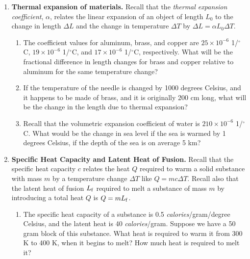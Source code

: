 \documentclass[10pt]{article}
\begin{document}
\maketitle

\begin{enumerate}
\item \textbf{Thermal expansion of materials.}  Recall that the \textit{thermal expansion coefficient}, $\alpha$, relates the linear expansion of an object of length $L_0$ to the change in length $\Delta L$ and the change in temperature $\Delta T$ by $\Delta L = \alpha L_0 \Delta T$.
\begin{enumerate}
\item The coefficient values for aluminum, brass, and copper are $25 \times 10^{-6}$ 1/$^{\circ}$C, $19 \times 10^{-6}$ 1/$^{\circ}$C, and $17 \times 10^{-6}$ 1/$^{\circ}$C, respectively.  What will be the fractional difference in length changes for brass and copper relative to aluminum for the same temperature change? \\ \vspace{2cm}
\item If the temperature of the needle is changed by 1000 degrees Celsius, and it happens to be made of brass, and it is originally 200 cm long, what will be the change in the length due to thermal expansion? \\ \vspace{2cm}
\item Recall that the volumetric expansion coefficient of water is $210 \times 10^{-6}$ 1/$^{\circ}$C.  What would be the change in sea level if the sea is warmed by 1 degrees Celsius, if the depth of the sea is on average 5 km? \\ \vspace{2cm}
\end{enumerate}
\item \textbf{Specific Heat Capacity and Latent Heat of Fusion.}  Recall that the specific heat capacity $c$ relates the heat $Q$ required to warm a solid substance with mass $m$ by a temperature change $\Delta T$ like $Q = m c \Delta T$.  Recall also that the latent heat of fusion $L_{\rm f}$ required to melt a substance of mass $m$ by introducing a total heat $Q$ is $Q = m L_{\rm f}$.
\begin{enumerate}
\item The specific heat capacity of a substance is 0.5 \textit{calories}/gram/degree Celsius, and the latent heat is 40 \textit{calories}/gram.  Suppose we have a 50 gram block of this substance.  What heat is required to warm it from 300 K to 400 K, when it begins to melt?  How much heat is required to melt it? \\ \vspace{2cm}

\end{enumerate}
\end{enumerate}
\end{document}
